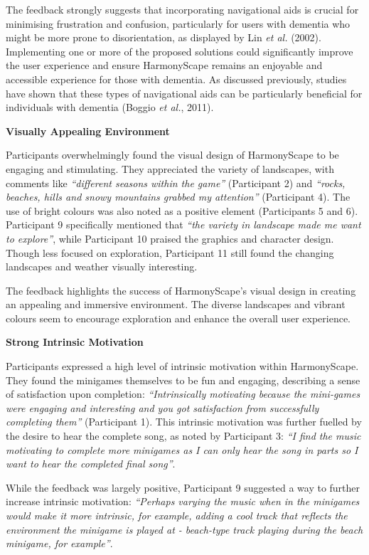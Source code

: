 \documentclass{l4proj}
\begin{document}
The feedback strongly suggests that incorporating navigational aids is crucial for minimising frustration and confusion, particularly for users with dementia who might be more prone to disorientation, as displayed by Lin \emph{et al.} (2002). Implementing one or more of the proposed solutions could significantly improve the user experience and ensure HarmonyScape remains an enjoyable and accessible experience for those with dementia. As discussed previously, studies have shown that these types of navigational aids can be particularly beneficial for individuals with dementia (Boggio \emph{et al.}, 2011).
\newline

\textbf{Visually Appealing Environment}

Participants overwhelmingly found the visual design of HarmonyScape to be engaging and stimulating. They appreciated the variety of landscapes, with comments like \emph{“different seasons within the game”} (Participant 2) and \emph{“rocks, beaches, hills and snowy mountains grabbed my attention”} (Participant 4). The use of bright colours was also noted as a positive element (Participants 5 and 6).  Participant 9 specifically mentioned that \emph{“the variety in landscape made me want to explore”}, while Participant 10 praised the graphics and character design. Though less focused on exploration, Participant 11 still found the changing landscapes and weather visually interesting.

The feedback highlights the success of HarmonyScape's visual design in creating an appealing and immersive environment. The diverse landscapes and vibrant colours seem to encourage exploration and enhance the overall user experience.
\newline

\textbf{Strong Intrinsic Motivation}

Participants expressed a high level of intrinsic motivation within HarmonyScape. They found the minigames themselves to be fun and engaging, describing a sense of satisfaction upon completion: \emph{“Intrinsically motivating because the mini-games were engaging and interesting and you got satisfaction from successfully completing them”} (Participant 1). This intrinsic motivation was further fuelled by the desire to hear the complete song, as noted by Participant 3: \emph{“I find the music motivating to complete more minigames as I can only hear the song in parts so I want to hear the completed final song”}.

While the feedback was largely positive, Participant 9 suggested a way to further increase intrinsic motivation: \emph{“Perhaps varying the music when in the minigames would make it more intrinsic, for example, adding a cool track that reflects the environment the minigame is played at - beach-type track playing during the beach minigame, for example”}.
\end{document}
